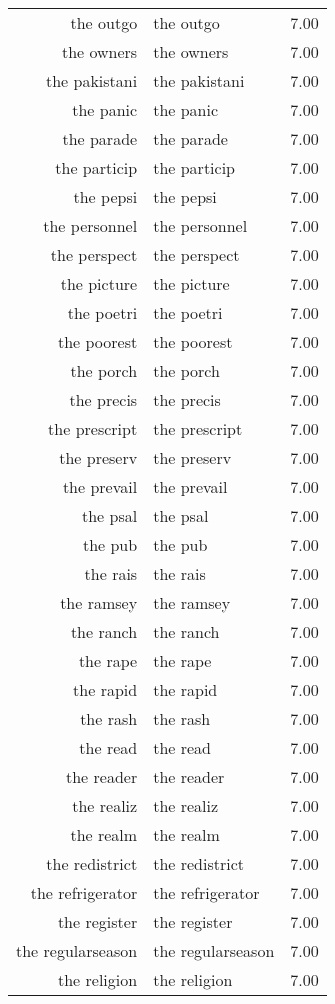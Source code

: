 \begin{table}[ht]
\begin{tabular}{rlr}
  the outgo & the outgo & 7.00 \\ 
  the owners & the owners & 7.00 \\ 
  the pakistani & the pakistani & 7.00 \\ 
  the panic & the panic & 7.00 \\ 
  the parade & the parade & 7.00 \\ 
  the particip & the particip & 7.00 \\ 
  the pepsi & the pepsi & 7.00 \\ 
  the personnel & the personnel & 7.00 \\ 
  the perspect & the perspect & 7.00 \\ 
  the picture & the picture & 7.00 \\ 
  the poetri & the poetri & 7.00 \\ 
  the poorest & the poorest & 7.00 \\ 
  the porch & the porch & 7.00 \\ 
  the precis & the precis & 7.00 \\ 
  the prescript & the prescript & 7.00 \\ 
  the preserv & the preserv & 7.00 \\ 
  the prevail & the prevail & 7.00 \\ 
  the psal & the psal & 7.00 \\ 
  the pub & the pub & 7.00 \\ 
  the rais & the rais & 7.00 \\ 
  the ramsey & the ramsey & 7.00 \\ 
  the ranch & the ranch & 7.00 \\ 
  the rape & the rape & 7.00 \\ 
  the rapid & the rapid & 7.00 \\ 
  the rash & the rash & 7.00 \\ 
  the read & the read & 7.00 \\ 
  the reader & the reader & 7.00 \\ 
  the realiz & the realiz & 7.00 \\ 
  the realm & the realm & 7.00 \\ 
  the redistrict & the redistrict & 7.00 \\ 
  the refrigerator & the refrigerator & 7.00 \\ 
  the register & the register & 7.00 \\ 
  the regularseason & the regularseason & 7.00 \\ 
  the religion & the religion & 7.00 \\ 

\end{tabular}
\end{table}
